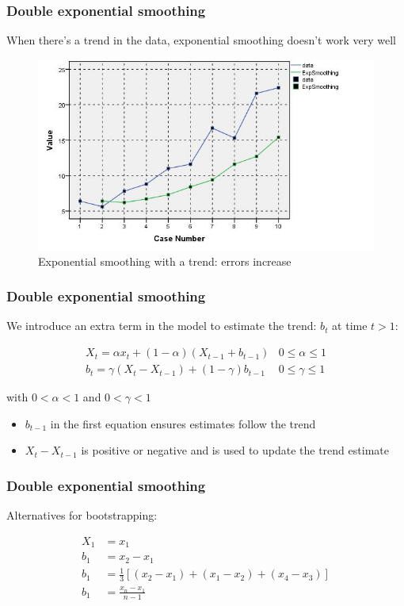 \documentclass{beamer}
\begin{document}
\begin{frame}
  \frametitle{Double exponential smoothing}

  When there's a trend in the data, exponential smoothing doesn't work very well
  
  \begin{figure}
    \centering
    \includegraphics[width=.7\textwidth]{img/tijdreeks61}
    \caption{Exponential smoothing with a trend: errors increase}
    \label{fig:tijdreeks61}
  \end{figure}

\end{frame}


\begin{frame}
  \frametitle{Double exponential smoothing}
  
  We introduce an extra term in the model to estimate the trend: $b_t$ at time $t > 1$:

\begin{eqnarray}
  X_{t} = \alpha x_{t} + (1-\alpha)(X_{t-1} + b_{t-1}) & 0 \leq \alpha \leq 1 \\
  b_{t} = \gamma(X_{t}-X_{t-1}) + (1-\gamma)b_{t-1} & 0 \leq \gamma \leq 1 
\label{eq:doubleSmoothing}
\end{eqnarray}

  with $0 < \alpha < 1$ and $0 < \gamma < 1$
  
  \begin{itemize}
    \item $ b_{t-1}$ in the first equation ensures estimates follow the trend
    \item $X_{t}-X_{t-1}$ is positive or negative and is used to update the trend estimate
  \end{itemize}
\end{frame}

\begin{frame}
  \frametitle{Double exponential smoothing}
  
  Alternatives for bootstrapping:
  
\begin{align*}
  X_{1} & = x_{1} \\
  b_{1} & = x_{2} - x_{1} \\
  b_{1} & = \frac{1}{3}\left[ (x_{2} - x_{1}) + (x_{1} - x_{2}) + (x_{4} - x_{3}) \right]\\
  b_{1} & = \frac{x_{n} - x_{1}}{n-1} \\
\end{align*}

\end{frame}
\end{document}
